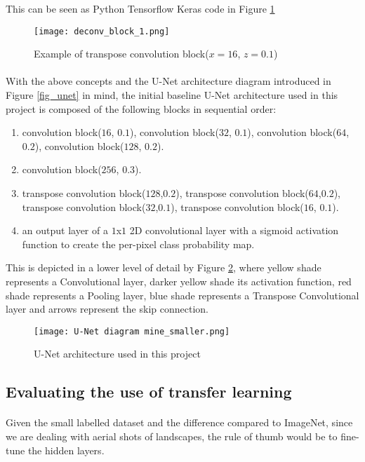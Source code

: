 This can be seen as Python Tensorflow Keras code in Figure \ref{deconv_block_1}
\begin{figure}[hbt!]
    \centering
    \texttt{[image: deconv\_block\_1.png]}
    \caption{Example of transpose convolution block($x=16$, $z=0.1$)}
    \label{deconv_block_1}
\end{figure}
\paragraph{}
With the above concepts and the U-Net architecture diagram introduced in Figure \ref{fig_unet} in mind, the initial baseline U-Net architecture used in this project is composed of the following blocks in sequential order:

    \begin{enumerate}
        \item convolution block($16$, $0.1$), convolution block($32$, $0.1$), convolution block($64$, $0.2$), convolution block($128$, $0.2$).
        \item convolution block($256$, $0.3$).
        \item transpose convolution block($128$,$0.2$), transpose convolution block($64$,$0.2$), transpose convolution block($32$,$ 0.1$), transpose convolution block($16$, $0.1$).
        \item an output layer of a $1$x$1$ 2D convolutional layer with a sigmoid activation function to create the per-pixel class probability map.
    \end{enumerate}

This is depicted in a lower level of detail by Figure \ref{unet_mine}, where yellow shade represents a Convolutional layer, darker yellow shade its activation function, red shade represents a Pooling layer, blue shade represents a Transpose Convolutional layer and arrows represent the skip connection.

\begin{figure}[hbt!]
    \centering
    \texttt{[image: U-Net diagram mine\_smaller.png]}
    \caption{U-Net architecture used in this project}
    \label{unet_mine}
\end{figure}

\subsection{Evaluating the use of transfer learning}
\paragraph{}
Given the small labelled dataset and the difference compared to ImageNet, since we are dealing with aerial shots of landscapes, the rule of thumb would be to fine-tune the hidden layers.

